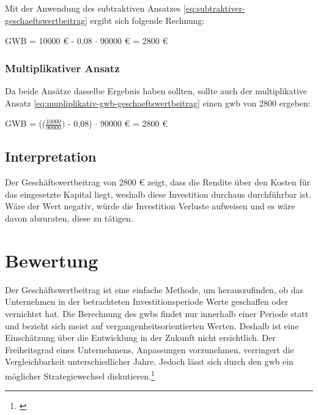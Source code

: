 Mit der Anwendung des subtraktiven Ansatzes \eqref{eq:subtraktiver-geschaeftswertbeitrag} ergibt sich folgende Rechnung:

\bigskip
GWB = 10000 € - 0,08 $\cdot$ 90000 € = 2800 €


\subsubsection{Multiplikativer Ansatz}

Da beide Ansätze dasselbe Ergebnis haben sollten, sollte auch der multiplikative Ansatz \eqref{eq:mupliplikativ-gwb-geschaeftswertbeitrag} einen \ac{gwb} von 2800 ergeben:

\bigskip
GWB = (($\frac{10000}{90000})$ - 0,08) $\cdot$ 90000 € = 2800 €

\subsection{Interpretation}

Der Geschäftswertbeitrag von 2800 € zeigt, dass die Rendite über den Kosten für das eingesetzte Kapital liegt, weshalb diese Investition durchaus durchführbar ist. Wäre der Wert negativ, würde die Investition Verluste aufweisen und es wäre davon abzuraten, diese zu tätigen.

\section{Bewertung}

Der Geschäftswertbeitrag ist eine einfache Methode, um herauszufinden, ob das Unternehmen in der betrachteten Investitionsperiode Werte geschaffen oder vernichtet hat. Die Berechnung des \ac{gwb}s findet nur innerhalb einer Periode statt und bezieht sich meist auf vergangenheitsorientierten Werten. Deshalb ist eine Einschätzung über die Entwicklung in der Zukunft nicht ersichtlich. Der Freiheitsgrad eines Unternehmens, Anpassungen vorzunehmen, verringert die Vergleichbarkeit unterschiedlicher Jahre. Jedoch lässt sich durch den \ac{gwb} ein möglicher Strategiewechsel diskutieren.\footnote{\cite{controlling-eva}}
